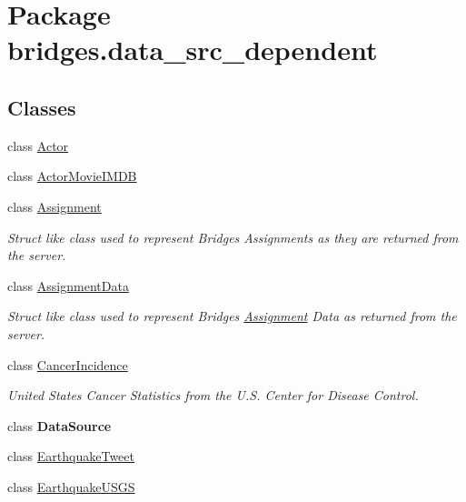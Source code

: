 \hypertarget{namespacebridges_1_1data__src__dependent}{}\section{Package bridges.\+data\+\_\+src\+\_\+dependent}
\label{namespacebridges_1_1data__src__dependent}
\subsection*{Classes}
\begin{DoxyCompactItemize}
\item 
class \mbox{\hyperlink{classbridges_1_1data__src__dependent_1_1_actor}{Actor}}
\item 
class \mbox{\hyperlink{classbridges_1_1data__src__dependent_1_1_actor_movie_i_m_d_b}{Actor\+Movie\+I\+M\+DB}}
\item 
class \mbox{\hyperlink{classbridges_1_1data__src__dependent_1_1_assignment}{Assignment}}
\begin{DoxyCompactList}\small\item\em Struct like class used to represent Bridges Assignments as they are returned from the server. \end{DoxyCompactList}\item 
class \mbox{\hyperlink{classbridges_1_1data__src__dependent_1_1_assignment_data}{Assignment\+Data}}
\begin{DoxyCompactList}\small\item\em Struct like class used to represent Bridges \mbox{\hyperlink{classbridges_1_1data__src__dependent_1_1_assignment}{Assignment}} Data as returned from the server. \end{DoxyCompactList}\item 
class \mbox{\hyperlink{classbridges_1_1data__src__dependent_1_1_cancer_incidence}{Cancer\+Incidence}}
\begin{DoxyCompactList}\small\item\em United States Cancer Statistics from the U.\+S. Center for Disease Control. \end{DoxyCompactList}\item 
class {\bfseries Data\+Source}
\item 
class \mbox{\hyperlink{classbridges_1_1data__src__dependent_1_1_earthquake_tweet}{Earthquake\+Tweet}}
\item 
class \mbox{\hyperlink{classbridges_1_1data__src__dependent_1_1_earthquake_u_s_g_s}{Earthquake\+U\+S\+GS}}

\end{DoxyCompactItemize}
